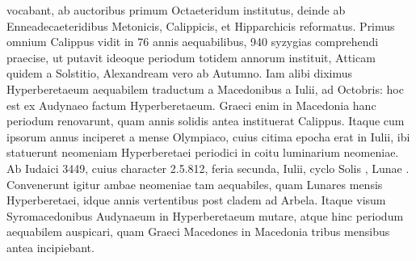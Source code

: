 vocabant, ab auctoribus primum Octaeteridum institutus, deinde
ab Enneadecaeteridibus Metonicis, Calippicis, et Hipparchicis reformatus.
Primus omnium Calippus vidit in 76 annis aequabilibus, 940
syzygias comprehendi praecise, ut putavit ideoque periodum totidem annorum
instituit, Atticam quidem a Solstitio, Alexandream vero ab Autumno.
Iam alibi diximus Hyperberetaeum aequabilem traductum a
Macedonibus a  Iulii, ad  Octobris:
 hoc est ex Audynaeo factum
Hyperberetaeum.
Graeci enim in Macedonia hanc periodum renovarunt,
quam annis  solidis antea instituerat Calippus.
Itaque
cum ipsorum annus inciperet a mense Olympiaco, cuius citima epocha
erat in  Iulii, ibi statuerunt neomeniam Hyperberetaei periodici
in coitu luminarium neomeniae.
Ab Iudaici 3449, cuius character 2.5.812,
feria secunda,  Iulii, cyclo Solis , Lunae .
Convenerunt
igitur ambae neomeniae tam aequabiles, quam Lunares mensis Hyperberetaei,
idque  annis vertentibus post cladem ad Arbela.
Itaque
visum Syromacedonibus Audynaeum in Hyperberetaeum mutare, atque
hinc periodum aequabilem auspicari, quam Graeci Macedones in Macedonia
tribus mensibus antea incipiebant.

